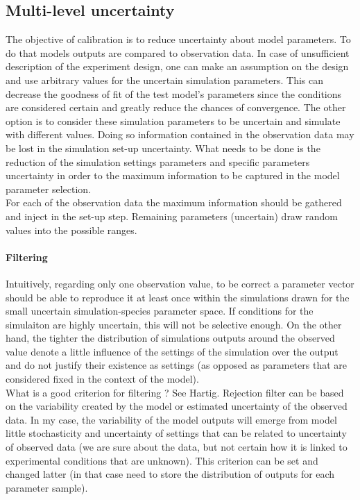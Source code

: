 \documentclass[a4paper, justified,marginals=raggedright]{tufte-handout}
\begin{document}
\subsection{Multi-level uncertainty}
The objective of calibration is to reduce uncertainty about model parameters. To do that models outputs are compared to observation data. In case of unsufficient description of the experiment design, one can make an assumption on the design and use arbitrary values for the uncertain simulation parameters. This can decrease the goodness of fit of the test model's parameters since the conditions are considered certain and greatly reduce the chances of convergence. The other option is to consider these simulation parameters to be uncertain and simulate with different values. Doing so information contained in the observation data may be lost in the simulation set-up uncertainty. What needs to be done is the reduction of the simulation settings parameters and specific parameters uncertainty in order to the maximum information to be captured in the model parameter selection.\\

\indent For each of the observation data the maximum information should be gathered and inject in the set-up step. Remaining parameters (uncertain) draw random values into the possible ranges.\\

\paragraph{Filtering}
Intuitively, regarding only one observation value, to be correct a parameter vector should be able to reproduce it at least once within the simulations drawn for the small uncertain simulation-species parameter space. If conditions for the simulaiton are highly uncertain, this will not be selective enough. On the other hand, the tighter the distribution of simulations outputs around the observed value denote a little influence of the settings of the simulation over the output and do not justify their existence as settings (as opposed as parameters that are considered fixed in the context of the model).\\
\indent What is a good criterion for filtering ? See Hartig. Rejection filter can be based on the variability created by the model or estimated uncertainty of the observed data. In my case, the variability of the model outputs will emerge from model little stochasticity and uncertainty of settings that can be related to uncertainty of observed data (we are sure about the data, but not certain how it is linked to experimental conditions that are unknown). This criterion can be set and changed latter (in that case need to store the distribution of outputs for each parameter sample).\\
\end{document}
